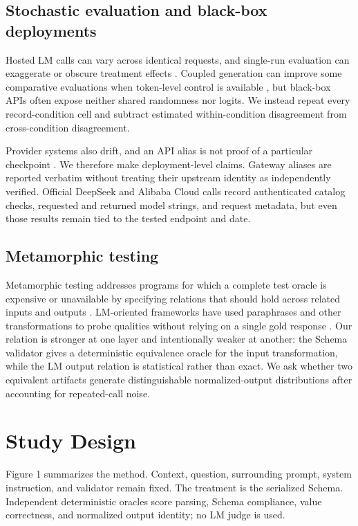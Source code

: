 \documentclass[11pt,a4paper]{article}
\begin{document}
\subsection{Stochastic evaluation and black-box deployments}
Hosted LM calls can vary across identical requests, and single-run evaluation can exaggerate or obscure treatment effects \citep{song2024nondeterminism,bouthillier2021variance}. Coupled generation can improve some comparative evaluations when token-level control is available \citep{corvelobenz2026coupled}, but black-box APIs often expose neither shared randomness nor logits. We instead repeat every record-condition cell and subtract estimated within-condition disagreement from cross-condition disagreement.

Provider systems also drift, and an API alias is not proof of a particular checkpoint \citep{chen2023drift,gao2025modelequality}. We therefore make deployment-level claims. Gateway aliases are reported verbatim without treating their upstream identity as independently verified. Official DeepSeek and Alibaba Cloud calls record authenticated catalog checks, requested and returned model strings, and request metadata, but even those results remain tied to the tested endpoint and date.

\subsection{Metamorphic testing}
Metamorphic testing addresses programs for which a complete test oracle is expensive or unavailable by specifying relations that should hold across related inputs and outputs \citep{chen2018metamorphic}. LM-oriented frameworks have used paraphrases and other transformations to probe qualities without relying on a single gold response \citep{hyun2024metal}. Our relation is stronger at one layer and intentionally weaker at another: the Schema validator gives a deterministic equivalence oracle for the input transformation, while the LM output relation is statistical rather than exact. We ask whether two equivalent artifacts generate distinguishable normalized-output distributions after accounting for repeated-call noise.

\section{Study Design}
Figure 1 summarizes the method. Context, question, surrounding prompt, system instruction, and validator remain fixed. The treatment is the serialized Schema. Independent deterministic oracles score parsing, Schema compliance, value correctness, and normalized output identity; no LM judge is used.
\end{document}
